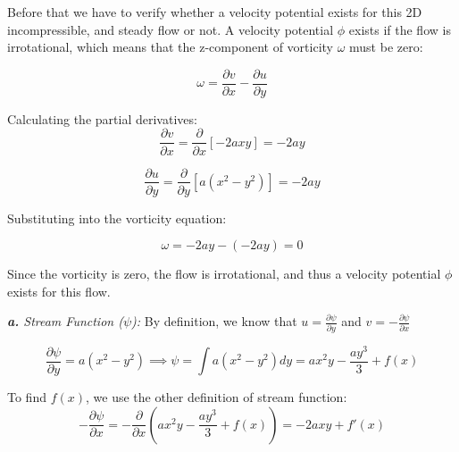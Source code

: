 \documentclass[12pt]{article}
\begin{document}
\begin{enumerate}
	      \vspace{1em}

	      Before that we have to verify whether a velocity potential exists for this 2D incompressible, and steady flow or not. A velocity potential $\phi$ exists if the flow is irrotational, which means that the z-component of vorticity $\omega$ must be zero:

	      \begin{equation*}
		      \omega = \frac{\partial v}{\partial x} - \frac{\partial u}{\partial y}
	      \end{equation*}

	      Calculating the partial derivatives:
	      \begin{equation*}
		      \frac{\partial v}{\partial x} = \frac{\partial}{\partial x}[-2axy] = -2ay
	      \end{equation*}

	      \begin{equation*}
		      \frac{\partial u}{\partial y} = \frac{\partial}{\partial y}[a(x^2-y^2)] = -2ay
	      \end{equation*}

	      Substituting into the vorticity equation:

	      \begin{equation*}
		      \omega = -2ay - (-2ay) = 0
	      \end{equation*}

	      Since the vorticity is zero, the flow is irrotational, and thus a velocity potential $\phi$ exists for this flow.

	      \vspace{1em}

	      \textit{\textbf{a.} Stream Function ($\psi$):} By definition, we know that $u = \frac{\partial \psi}{\partial y}$ and $v = -\frac{\partial \psi}{\partial x}$

	      \begin{equation*}
		      \frac{\partial \psi}{\partial y} = a(x^2-y^2) \implies \psi = \int a(x^2-y^2)dy = ax^2y-\frac{ay^3}{3} + f(x)
	      \end{equation*}

	      To find $f(x)$, we use the other definition of stream function:
	      \begin{equation*}
		      -\frac{\partial \psi}{\partial x} = -\frac{\partial}{\partial x}\left(ax^2y-\frac{ay^3}{3} + f(x)\right) = -2axy + f'(x)
	      \end{equation*}


\end{enumerate}
\end{document}
